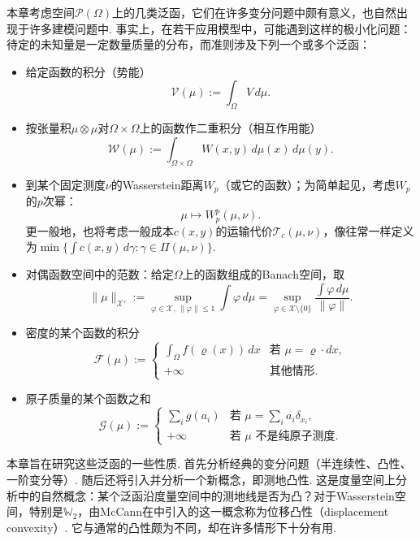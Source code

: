 本章考虑空间$\mathscr P(\Omega)$上的几类泛函，它们在许多变分问题中颇有意义，也自然出现于许多建模问题中. 事实上，在若干应用模型中，可能遇到这样的极小化问题：待定的未知量是一定数量质量的分布，而准则涉及下列一个或多个泛函：
\begin{itemize}
 \item {}\label{idx:i116-p249}
给定函数的积分（势能）
 \[
 \mathscr V(\mu):=\int_\Omega V\,d\mu.
 \]
 \item {}\label{idx:i79-p249}
按张量积$\mu\otimes\mu$对$\Omega\times\Omega$上的函数作二重积分（相互作用能）
 \[
 \mathscr W(\mu):=\int_{\Omega\times\Omega}W(x,y)\,d\mu(x)\,d\mu(y).
 \]
 \item 到某个固定测度$\nu$的Wasserstein距离$W_p$（或它的函数）；为简单起见，考虑$W_p$的$p$次幂：
 \[
 \mu\mapsto W_p^p(\mu,\nu).
 \]
 更一般地，也将考虑一般成本$c(x,y)$的运输代价$\mathscr T_c(\mu,\nu)$，像往常一样定义为$\min\{\int c(x,y)\,d\gamma:\gamma\in\Pi(\mu,\nu)\}$.
 \item {}\label{idx:i45-p249}
对偶函数空间中的范数：给定$\Omega$上的函数组成的Banach空间，取
 \[
 \|\mu\|_{\mathscr X'}:=\sup_{\varphi\in\mathscr X,\,\|\varphi\|\leq1}
       \int\varphi\,d\mu
     =\sup_{\varphi\in\mathscr X\setminus\{0\}}
       \frac{\int\varphi\,d\mu}{\|\varphi\|}.
 \]
 \item 密度的某个函数的积分
 \[
 \mathscr F(\mu):=\begin{cases}
 \displaystyle\int_\Omega f(\varrho(x))\,dx&\text{若 }\mu=\varrho\cdot dx,\\
 +\infty&\text{其他情形}.
 \end{cases}
 \]
 \item 原子质量的某个函数之和
 \[
 \mathscr G(\mu):=\begin{cases}
 \displaystyle\sum_i g(a_i)&\text{若 }\mu=\sum_i a_i\delta_{x_i},\\
 +\infty&\text{若 }\mu\text{ 不是纯原子测度}.
 \end{cases}
 \]
\end{itemize}
本章旨在研究这些泛函的一些性质. 首先分析经典的变分问题（半连续性、凸性、一阶变分等）. 随后还将引入并分析一个新概念，即测地凸性. 这是度量空间上分析中的自然概念：某个泛函沿度量空间中的测地线是否为凸？对于Wasserstein空间，特别是$\mathbb W_2$，由McCann在\cite{b229}中引入的这一概念称为位移凸性（displacement convexity）. 它与通常的凸性颇为不同，却在许多情形下十分有用.
